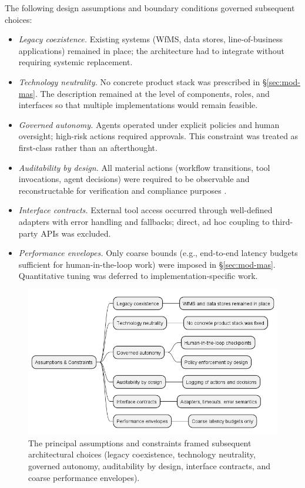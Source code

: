 The following design assumptions and boundary conditions governed subsequent choices:
\begin{itemize}
\item \emph{Legacy coexistence.} Existing systems (WfMS, data stores, line-of-business applications) remained in place; the architecture had to integrate without requiring systemic replacement.
\item \emph{Technology neutrality.} No concrete product stack was prescribed in §\ref{sec:mod-mas}. The description remained at the level of components, roles, and interfaces so that multiple implementations would remain feasible.
\item \emph{Governed autonomy.} Agents operated under explicit policies and human oversight; high-risk actions required approvals. This constraint was treated as first-class rather than an afterthought.
\item \emph{Auditability by design.} All material actions (workflow transitions, tool invocations, agent decisions) were required to be observable and reconstructable for verification and compliance purposes \parencite{IEEEStandard1990}.
\item \emph{Interface contracts.} External tool access occurred through well-defined adapters with error handling and fallbacks; direct, ad hoc coupling to third-party APIs was excluded.
\item \emph{Performance envelopes.} Only coarse bounds (e.g., end-to-end latency budgets sufficient for human-in-the-loop work) were imposed in §\ref{sec:mod-mas}. Quantitative tuning was deferred to implementation-specific work.
\end{itemize}

\begin{figure}[t]
  \centering
  \includegraphics[width=0.8\linewidth]{ressources/MAS/figures/5_1d_assumptions_mindmap.png}
  \caption{The principal assumptions and constraints framed subsequent architectural choices (legacy coexistence, technology neutrality, governed autonomy, auditability by design, interface contracts, and coarse performance envelopes).}
  \label{fig:5.1d-assumptions}
\end{figure}

